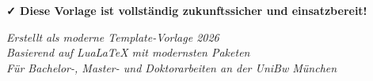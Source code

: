 \documentclass[12pt,a4paper]{article}
\begin{document}
\vspace{1cm}

\textcolor{success}{\textbf{✓ Diese Vorlage ist vollständig zukunftssicher und einsatzbereit!}}

\begin{center}
\textit{Erstellt als moderne Template-Vorlage 2026}\\
\textit{Basierend auf LuaLaTeX mit modernsten Paketen}\\
\textit{Für Bachelor-, Master- und Doktorarbeiten an der UniBw München}
\end{center}
\end{document}
